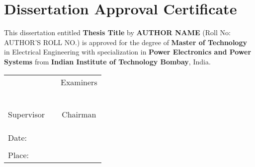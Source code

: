 \chapter*{\center Dissertation Approval Certificate}

\thispagestyle{empty}




This dissertation entitled \textbf{Thesis Title} by
\textbf{AUTHOR NAME} (Roll No: AUTHOR'S ROLL NO.) is approved for the degree of \textbf{Master of Technology} in Electrical Engineering with specialization in \textbf{Power Electronics and Power Systems} from \textbf{Indian Institute of Technology Bombay}, India.


\vspace{1.5cm}


\begin{tabular}{llc}
\hspace{4cm} & \hspace{4cm} & \hspace{1.5cm} Examiners \hspace{1.5cm} \\ \\
             &              & \hrulefill \\ \\ \\
             &              & \hrulefill \\ \\


  \hspace{1cm} Supervisor &              & Chairman   \\ \\
   \hrulefill&              &  \hrulefill \\ \\


Date:\hrulefill & & \\ \\
Place: \hrulefill & & \\
\end{tabular}

